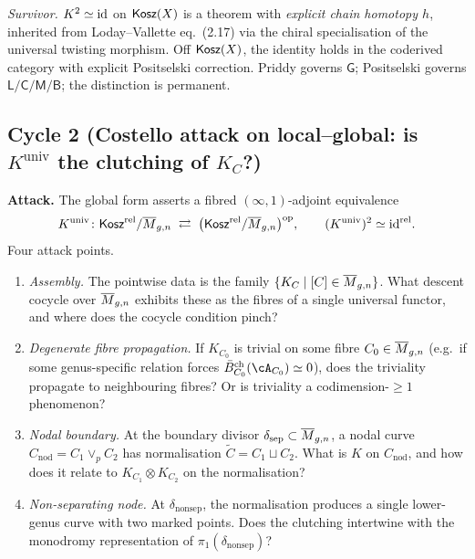 \emph{Survivor.} $K^{2}\simeq\mathrm{id}$ on $\mathsf{Kosz}(X)$ is a theorem with
\emph{explicit chain homotopy $h$}, inherited from Loday--Vallette
eq.\ (2.17) via the chiral specialisation of the universal twisting
morphism. Off $\mathsf{Kosz}(X)$, the identity holds in the coderived
category with explicit Positselski correction. Priddy governs
$\mathsf{G}$; Positselski governs $\mathsf{L/C/M/B}$; the
distinction is permanent.

\subsection*{Cycle 2 (Costello attack on local--global: is $K^{\mathrm{univ}}$ the clutching of $K_{C}$?)}

\textbf{Attack.} The global form asserts a fibred
$(\infty,1)$-adjoint equivalence
\[
K^{\mathrm{univ}}\colon
\mathsf{Kosz}^{\mathrm{rel}}/\overline{M}_{g,n}
\;\rightleftarrows\;
\bigl(\mathsf{Kosz}^{\mathrm{rel}}/\overline{M}_{g,n}\bigr)^{\mathrm{op}},
\qquad
(K^{\mathrm{univ}})^{2}\simeq\mathrm{id}^{\mathrm{rel}}.
\]
Four attack points.

\begin{enumerate}
\item[Q2.1] \emph{Assembly.} The pointwise data is the family
$\{K_{C}\mid [C]\in\overline{M}_{g,n}\}$. What descent cocycle over
$\overline{M}_{g,n}$ exhibits these as the fibres of a single universal
functor, and where does the cocycle condition pinch?
\item[Q2.2] \emph{Degenerate fibre propagation.} If $K_{C_{0}}$ is
trivial on some fibre $C_{0}\in\overline{M}_{g,n}$ (e.g.\ if some
genus-specific relation forces
$\Bbarch_{C_{0}}(\cA_{C_{0}})\simeq 0$), does the triviality
propagate to neighbouring fibres? Or is triviality a
codimension-$\geq 1$ phenomenon?
\item[Q2.3] \emph{Nodal boundary.} At the boundary divisor
$\delta_{\mathrm{sep}}\subset\overline{M}_{g,n}$, a nodal curve
$C_{\mathrm{nod}} = C_{1}\vee_{p}C_{2}$ has normalisation
$\tilde C = C_{1}\sqcup C_{2}$. What is $K$ on $C_{\mathrm{nod}}$, and
how does it relate to $K_{C_{1}}\otimes K_{C_{2}}$ on the
normalisation?
\item[Q2.4] \emph{Non-separating node.} At
$\delta_{\mathrm{nonsep}}$, the normalisation produces a single
lower-genus curve with two marked points. Does the clutching
intertwine with the monodromy representation of
$\pi_{1}(\delta_{\mathrm{nonsep}})$?
\end{enumerate}

